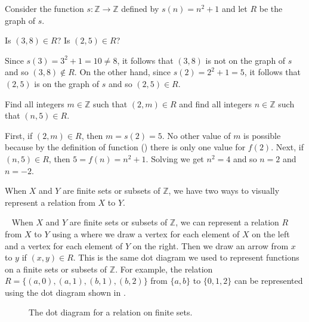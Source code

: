 \begin{exam}
\label{exam_graph_fn_is_relation}
    Consider the function $s: \mathbb{Z} \to \mathbb{Z}$ defined by $s(n) = n^2+1$ and let $R$ be the graph of $s$.
       \begin{apart}
           \item   Is $(3,8) \in R$?  Is $(2,5) \in R$?
               \begin{soln}
                   Since $s(3) = 3^2+1=10 \neq 8$, it follows that $(3,8)$ is not on the graph of $s$ and so $(3,8) \notin R$.  On the other hand, since $s(2) = 2^2+1=5$, it follows that $(2,5)$ is on the graph of $s$ and so $(2,5) \in R$.
               \end{soln}
            \item Find all integers $m \in \mathbb{Z}$ such that $(2,m) \in R$ and find all integers $n \in \mathbb{Z}$ such that $(n,5) \in R$.
                \begin{soln}
                    First, if $(2,m) \in R$, then $m = s(2) = 5$.  No other value of $m$ is possible because by the definition of function () there is only one value for $f(2)$.  Next, if $(n,5) \in R$, then $5 = f(n) = n^2 +1$.  Solving we get $n^2=4$ and so $n=2$ and $n=-2$.  
                \end{soln}
       \end{apart}
\end{exam}

When $X$ and $Y$ are finite sets or subsets of $\mathbb{Z}$, we have two ways to visually represent a relation from $X$ to $Y$.

\begin{defn}
\label{defn_draw_relations_dot_diagrams}
~
    When $X$ and $Y$ are finite sets or subsets of $\mathbb{Z}$, we can represent a relation $R$ from $X$ to $Y$ using a  where we draw a vertex for each element of $X$ on the left and a vertex for each element of $Y$ on the right.  Then we draw an arrow from $x$ to $y$ if $(x,y) \in R$.  This is the same dot diagram we used to represent functions on a finite sets or subsets of $\mathbb{Z}$.  For example, the relation $R=\{(a,0),(a,1),(b,1),(b,2)\}$ from $\{a,b\}$ to $\{0,1,2\}$ can be represented using the dot diagram shown in .
        \begin{figure}[hbtp]
            \centering
            
            \caption{The dot diagram for a relation on finite sets.}
            \label{fig_relation_finite_dot_diagram}
        \end{figure}
\end{defn}

